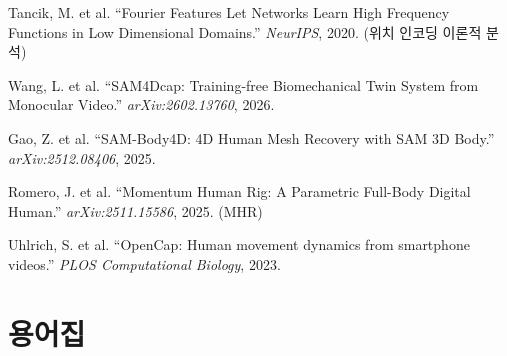 \documentclass[11pt, a4paper]{report}
\begin{document}
\begin{enumerate}[leftmargin=*, label={[\arabic*]}]
  \item Tancik, M. et al. ``Fourier Features Let Networks Learn High Frequency Functions in Low Dimensional Domains.'' \textit{NeurIPS}, 2020. (위치 인코딩 이론적 분석)

  \item Wang, L. et al. ``SAM4Dcap: Training-free Biomechanical Twin System from Monocular Video.'' \textit{arXiv:2602.13760}, 2026.

  \item Gao, Z. et al. ``SAM-Body4D: 4D Human Mesh Recovery with SAM 3D Body.'' \textit{arXiv:2512.08406}, 2025.

  \item Romero, J. et al. ``Momentum Human Rig: A Parametric Full-Body Digital Human.'' \textit{arXiv:2511.15586}, 2025. (MHR)

  \item Uhlrich, S. et al. ``OpenCap: Human movement dynamics from smartphone videos.'' \textit{PLOS Computational Biology}, 2023.
\end{enumerate}


\chapter*{용어집}
\end{document}
